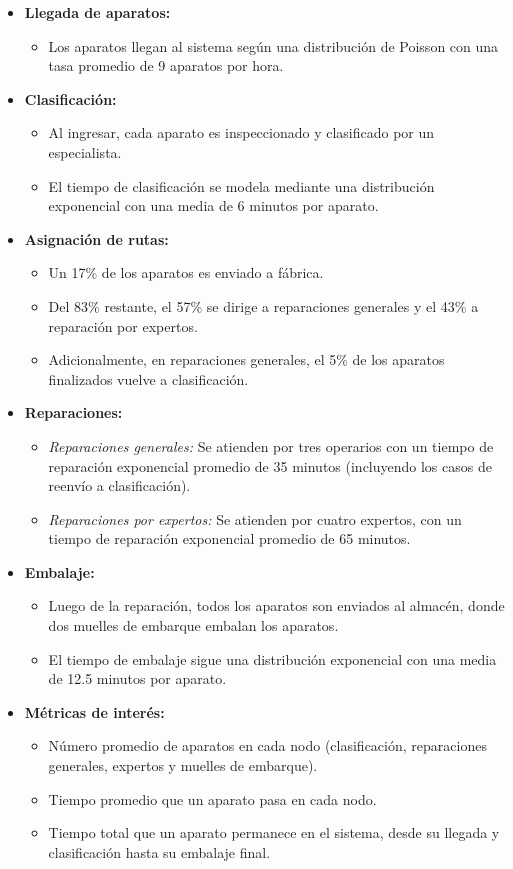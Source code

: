 \documentclass[a4paper,12pt]{article}
\begin{document}
\begin{itemize}
    \item \textbf{Llegada de aparatos:} 
    \begin{itemize}
        \item Los aparatos llegan al sistema según una distribución de Poisson con una tasa promedio de 9 aparatos por hora.
    \end{itemize}
    \item \textbf{Clasificación:}
    \begin{itemize}
        \item Al ingresar, cada aparato es inspeccionado y clasificado por un especialista.
        \item El tiempo de clasificación se modela mediante una distribución exponencial con una media de 6 minutos por aparato.
    \end{itemize}
    \item \textbf{Asignación de rutas:}
    \begin{itemize}
        \item Un 17\% de los aparatos es enviado a fábrica.
        \item Del 83\% restante, el 57\% se dirige a reparaciones generales y el 43\% a reparación por expertos.
        \item Adicionalmente, en reparaciones generales, el 5\% de los aparatos finalizados vuelve a clasificación.
    \end{itemize}
    \item \textbf{Reparaciones:}
    \begin{itemize}
        \item \textit{Reparaciones generales:} Se atienden por tres operarios con un tiempo de reparación exponencial promedio de 35 minutos (incluyendo los casos de reenvío a clasificación).
        \item \textit{Reparaciones por expertos:} Se atienden por cuatro expertos, con un tiempo de reparación exponencial promedio de 65 minutos.
    \end{itemize}
    \item \textbf{Embalaje:}
    \begin{itemize}
        \item Luego de la reparación, todos los aparatos son enviados al almacén, donde dos muelles de embarque embalan los aparatos.
        \item El tiempo de embalaje sigue una distribución exponencial con una media de 12.5 minutos por aparato.
    \end{itemize}
    \item \textbf{Métricas de interés:}
    \begin{itemize}
        \item Número promedio de aparatos en cada nodo (clasificación, reparaciones generales, expertos y muelles de embarque).
        \item Tiempo promedio que un aparato pasa en cada nodo.
        \item Tiempo total que un aparato permanece en el sistema, desde su llegada y clasificación hasta su embalaje final.
    \end{itemize}
\end{itemize}
\end{document}
